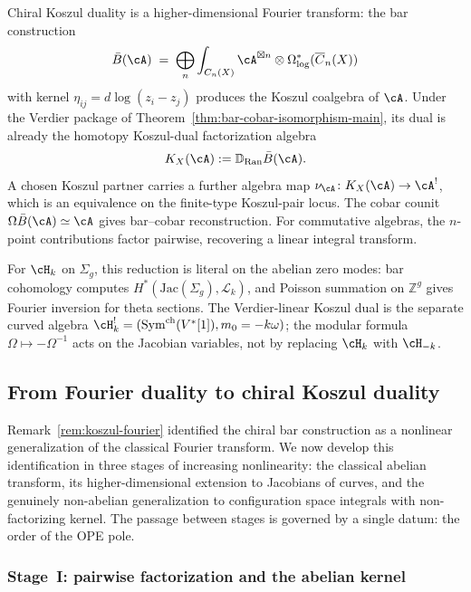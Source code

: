 \begin{remark}
\label{rem:koszul-fourier}
Chiral Koszul duality is a higher-dimensional Fourier transform: the bar construction
\[
\bar{B}(\cA) \;=\; \bigoplus_n
 \int_{C_n(X)} \cA^{\boxtimes n}
 \otimes \Omega^*_{\log}(\overline{C}_n(X))
\]
with kernel $\eta_{ij} = d\log(z_i - z_j)$ produces the Koszul
coalgebra of $\cA$. Under the Verdier package of
Theorem~\ref{thm:bar-cobar-isomorphism-main}, its dual is already the
homotopy Koszul-dual factorization algebra
\[
K_X(\cA):=\mathbb{D}_{\operatorname{Ran}}\bar{B}(\cA).
\]
A chosen Koszul partner carries a further algebra map
$\nu_{\cA}\colon K_X(\cA)\to\cA^!$, which is an equivalence on the
finite-type Koszul-pair locus.  The cobar counit
$\Omega\bar{B}(\cA)\simeq\cA$ gives bar--cobar reconstruction.
For commutative algebras, the $n$-point contributions factor pairwise,
recovering a linear integral transform.

For $\cH_k$ on $\Sigma_g$, this reduction is literal on the
abelian zero modes: bar cohomology computes
$H^*(\mathrm{Jac}(\Sigma_g), \mathcal{L}_k)$, and Poisson summation
on $\mathbb{Z}^g$ gives Fourier inversion for theta sections. The
Verdier-linear Koszul dual is the separate curved algebra
$\cH_k^!=(\mathrm{Sym}^{\mathrm{ch}}(V^*[1]),m_0=-k\omega)$; the
modular formula $\Omega\mapsto-\Omega^{-1}$ acts on the Jacobian
variables, not by replacing $\cH_k$ with $\cH_{-k}$.
\end{remark}

\subsection{From Fourier duality to chiral Koszul duality}
\label{subsec:fourier-to-koszul}

Remark~\ref{rem:koszul-fourier} identified the chiral bar construction
as a nonlinear generalization of the classical Fourier transform. We
now develop this identification in three stages of increasing
nonlinearity: the classical abelian transform, its higher-dimensional
extension to Jacobians of curves, and the genuinely non-abelian
generalization to configuration space integrals with non-factorizing
kernel. The passage between stages is governed by a single datum:
the order of the OPE pole.

\subsubsection{Stage~I: pairwise factorization and the abelian kernel}

